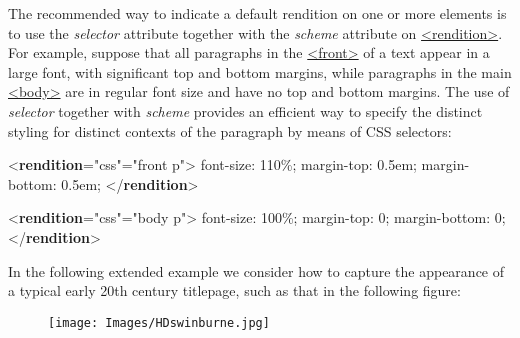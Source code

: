The recommended way to indicate a default rendition on one or more elements is to use the {\itshape selector} attribute together with the {\itshape scheme} attribute on \hyperref[TEI.rendition]{<rendition>}. For example, suppose that all paragraphs in the \hyperref[TEI.front]{<front>} of a text appear in a large font, with significant top and bottom margins, while paragraphs in the main \hyperref[TEI.body]{<body>} are in regular font size and have no top and bottom margins. The use of {\itshape selector} together with {\itshape scheme} provides an efficient way to specify the distinct styling for distinct contexts of the paragraph by means of CSS selectors: \par\bgroup{}\exampleFont \begin{shaded}\noindent\mbox{}{<\textbf{rendition}\hspace*{1em}{scheme}="{css}"\hspace*{1em}{selector}="{front p}">} \mbox{}\newline 
 font-size: 110\%;\mbox{}\newline 
 margin-top: 0.5em;\mbox{}\newline 
 margin-bottom: 0.5em;\mbox{}\newline 
{</\textbf{rendition}>}\end{shaded}\egroup\par \noindent  \par\bgroup{}\exampleFont \begin{shaded}\noindent\mbox{}{<\textbf{rendition}\hspace*{1em}{scheme}="{css}"\hspace*{1em}{selector}="{body p}">} \mbox{}\newline 
 font-size: 100\%;\mbox{}\newline 
 margin-top: 0;\mbox{}\newline 
 margin-bottom: 0;\mbox{}\newline 
{</\textbf{rendition}>}\end{shaded}\egroup\par \par
In the following extended example we consider how to capture the appearance of a typical early 20th century titlepage, such as that in the following figure: \begin{figure}[htbp]
\noindent\noindent\texttt{[image: Images/HDswinburne.jpg]}\end{figure}
